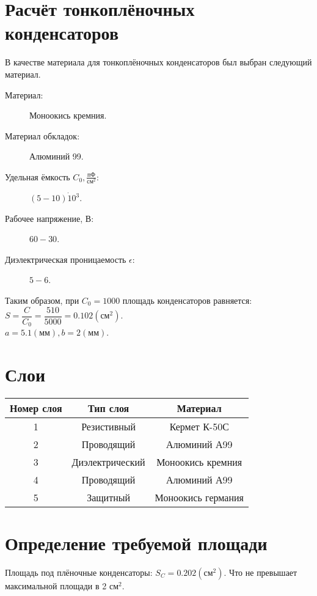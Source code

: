 \documentclass[12pt, a4paper] {ncc}
\begin{document}
\section{Расчёт тонкоплёночных конденсаторов}
	В качестве материала для тонкоплёночных конденсаторов был
	выбран следующий материал.
	\begin{description}
		\item[Материал:] Моноокись кремния.
		\item[Материал обкладок:] Алюминий 99.
		\item[Удельная ёмкость $C_0, \frac{\text{пФ}}{\text{см}^2}$:] $(5 - 10) \dot 10^3$.
		\item[Рабочее напряжение, В:] $60-30$.
		\item[Диэлектрическая проницаемость $\epsilon$:] $5-6$.
	\end{description}
	Таким образом, при $C_0 = 1000$ площадь конденсаторов равняется:\\

	$S = \dfrac{C} {C_0} = \dfrac {510} {5000} = 0.102 (\text{см}^2)$.\\

	$a = 5.1 (\text{мм}), b = 2 (\text{мм})$.
	

\section{Слои}
	\begin{tabular}{|c|c|c|}
		\hline
		Номер слоя & Тип слоя 			& Материал \\ \hline
		  	1	   & Резистивный 		& Кермет К-50С \\ \hline
			2      & Проводящий			& Алюминий А99 \\ \hline
			3 	   & Диэлектрический	& Моноокись кремния \\ \hline
		    4 	   & Проводящий			& Алюминий А99 \\ \hline
			5	   & Защитный 			& Моноокись германия \\ \hline 
	\end{tabular}

\section{Определение требуемой площади}

	Площадь под плёночные конденсаторы: $S_C = 0.202(\text{см}^2)$.
	Что не превышает максимальной площади в 2 $\text{см}^2$.\\
\end{document}
